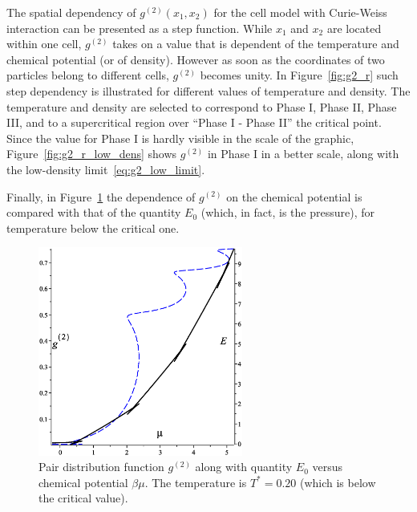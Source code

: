 The spatial dependency of $g^{(2)}(x_1, x_2)$ for the cell model with Curie-Weiss interaction can be presented as a step function. While $x_1$ and $x_2$ are located within one cell, $g^{(2)}$ takes on a value that is dependent of the temperature and chemical potential (or of density). However as soon as the coordinates of two particles belong to different cells, $g^{(2)}$ becomes unity.
In Figure~\ref{fig:g2_r} such step dependency is illustrated for different values of temperature and density. The temperature and density are selected to correspond to Phase I, Phase II, Phase III, and to a supercritical region over ``Phase I - Phase II'' the critical point. Since the value for Phase I is hardly visible in the scale of the graphic, Figure~\ref{fig:g2_r_low_dens} shows $g^{(2)}$ in Phase I in a better scale, along with the low-density limit~\eqref{eq:g2_low_limit}.

Finally, in Figure~\ref{fig:g2_E_mu} the dependence of $g^{(2)}$ on the chemical potential is compared with that of the quantity $E_0$ (which, in fact, is the pressure), for temperature below the critical one.
\begin{figure}[htbp]
	\includegraphics[width=0.6\textwidth,angle=0]{g2_vs_E_vs_mu}
	\caption{Pair distribution function $g^{(2)}$ along with quantity $E_0$ versus chemical potential $\beta\mu$. The temperature is $T^*=0.20$ (which is below the critical value).}
	\label{fig:g2_E_mu}
\end{figure}

